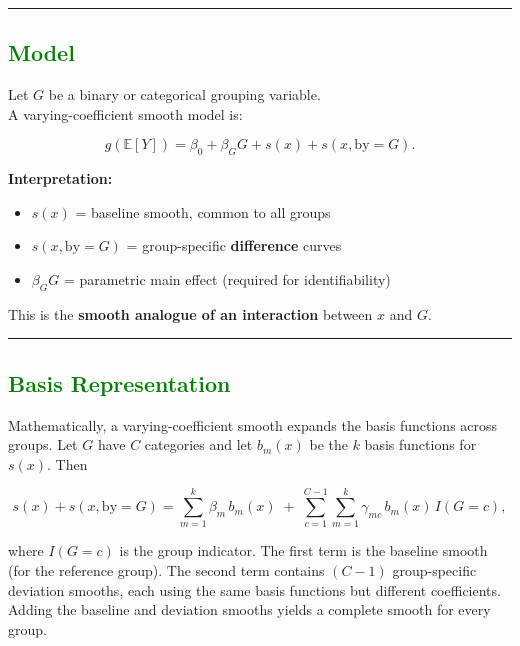 \documentclass[
  letterpaper,
  DIV=11,
  numbers=noendperiod]{scrreprt}
\providecommand{\tightlist}{%
  \setlength{\itemsep}{0pt}\setlength{\parskip}{0pt}}\usepackage{longtable,booktabs,array}
\begin{document}
\begin{center}\rule{0.5\linewidth}{0.5pt}\end{center}

\hypertarget{section-37}{%
\subsection*{\texorpdfstring{\textcolor{green}{Model}}{}}\label{section-37}}

Let \(G\) be a binary or categorical grouping variable.\\
A varying-coefficient smooth model is:

\[
g(\mathbb{E}[Y]) =
\beta_0
+ \beta_G G
+ s(x)
+ s(x,\text{by}=G).
\]

\textbf{Interpretation:}

\begin{itemize}
\tightlist
\item
  \(s(x)\) = baseline smooth, common to all groups\\
\item
  \(s(x,\text{by}=G)\) = group-specific \textbf{difference} curves\\
\item
  \(\beta_G G\) = parametric main effect (required for identifiability)
\end{itemize}

This is the \textbf{smooth analogue of an interaction} between \(x\) and
\(G\).

\begin{center}\rule{0.5\linewidth}{0.5pt}\end{center}

\hypertarget{section-38}{%
\subsection*{\texorpdfstring{\textcolor{green}{Basis Representation}}{}}\label{section-38}}

Mathematically, a varying-coefficient smooth expands the basis functions
across groups. Let \(G\) have \(C\) categories and let \(b_m(x)\) be the
\(k\) basis functions for \(s(x)\). Then

\[
s(x) + s(x,\text{by}=G)
=
\sum_{m=1}^k \beta_m\, b_m(x)
\;+\;
\sum_{c=1}^{C-1}
\sum_{m=1}^k 
\gamma_{mc}\, b_m(x)\, I(G=c),
\]

where \(I(G=c)\) is the group indicator. The first term is the baseline
smooth (for the reference group). The second term contains \((C-1)\)
group-specific deviation smooths, each using the same basis functions
but different coefficients. Adding the baseline and deviation smooths
yields a complete smooth for every group.
\end{document}
